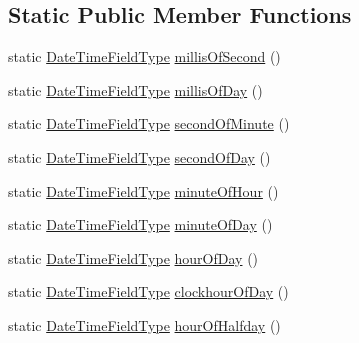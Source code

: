 \subsection*{Static Public Member Functions}
\begin{DoxyCompactItemize}
\item 
static \hyperlink{classorg_1_1joda_1_1time_1_1_date_time_field_type}{Date\-Time\-Field\-Type} \hyperlink{classorg_1_1joda_1_1time_1_1_date_time_field_type_a9ccd1aad58c99cb3f050cc3d7cf71a28}{millis\-Of\-Second} ()
\item 
static \hyperlink{classorg_1_1joda_1_1time_1_1_date_time_field_type}{Date\-Time\-Field\-Type} \hyperlink{classorg_1_1joda_1_1time_1_1_date_time_field_type_a4dae42be372e01dacee19392903a2aba}{millis\-Of\-Day} ()
\item 
static \hyperlink{classorg_1_1joda_1_1time_1_1_date_time_field_type}{Date\-Time\-Field\-Type} \hyperlink{classorg_1_1joda_1_1time_1_1_date_time_field_type_a05046ef80e32f77c60f9dff3e3c2301d}{second\-Of\-Minute} ()
\item 
static \hyperlink{classorg_1_1joda_1_1time_1_1_date_time_field_type}{Date\-Time\-Field\-Type} \hyperlink{classorg_1_1joda_1_1time_1_1_date_time_field_type_a14ae685449186396ae3d796bfece4378}{second\-Of\-Day} ()
\item 
static \hyperlink{classorg_1_1joda_1_1time_1_1_date_time_field_type}{Date\-Time\-Field\-Type} \hyperlink{classorg_1_1joda_1_1time_1_1_date_time_field_type_a46319b0f7a8949cbad2abf595f1dfb2c}{minute\-Of\-Hour} ()
\item 
static \hyperlink{classorg_1_1joda_1_1time_1_1_date_time_field_type}{Date\-Time\-Field\-Type} \hyperlink{classorg_1_1joda_1_1time_1_1_date_time_field_type_a7cc60fc78c26aed67f4f275277955813}{minute\-Of\-Day} ()
\item 
static \hyperlink{classorg_1_1joda_1_1time_1_1_date_time_field_type}{Date\-Time\-Field\-Type} \hyperlink{classorg_1_1joda_1_1time_1_1_date_time_field_type_aa74a1be9048ec18b3d8bdbe1c1cf00aa}{hour\-Of\-Day} ()
\item 
static \hyperlink{classorg_1_1joda_1_1time_1_1_date_time_field_type}{Date\-Time\-Field\-Type} \hyperlink{classorg_1_1joda_1_1time_1_1_date_time_field_type_ab038ceea9a7c6f915b41469011ff59f3}{clockhour\-Of\-Day} ()
\item 
static \hyperlink{classorg_1_1joda_1_1time_1_1_date_time_field_type}{Date\-Time\-Field\-Type} \hyperlink{classorg_1_1joda_1_1time_1_1_date_time_field_type_a596c3d1353988175cb8344bdd87fa0d5}{hour\-Of\-Halfday} ()
\item 

\end{DoxyCompactItemize}
